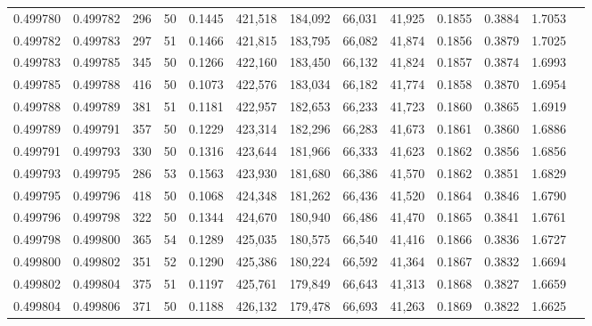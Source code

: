 \begin{tabular}{rrrrrrrrrrrrr}
0.499780 & 0.499782 & 296 &  50 &                                     0.1445 & 421,518 & 184,092 &  66,031 &  41,925 & 0.1855 & 0.3884 & 1.7053 \\
0.499782 & 0.499783 & 297 &  51 &                                     0.1466 & 421,815 & 183,795 &  66,082 &  41,874 & 0.1856 & 0.3879 & 1.7025 \\
0.499783 & 0.499785 & 345 &  50 &                                     0.1266 & 422,160 & 183,450 &  66,132 &  41,824 & 0.1857 & 0.3874 & 1.6993 \\
0.499785 & 0.499788 & 416 &  50 &                                     0.1073 & 422,576 & 183,034 &  66,182 &  41,774 & 0.1858 & 0.3870 & 1.6954 \\
0.499788 & 0.499789 & 381 &  51 &                                     0.1181 & 422,957 & 182,653 &  66,233 &  41,723 & 0.1860 & 0.3865 & 1.6919 \\
0.499789 & 0.499791 & 357 &  50 &                                     0.1229 & 423,314 & 182,296 &  66,283 &  41,673 & 0.1861 & 0.3860 & 1.6886 \\
0.499791 & 0.499793 & 330 &  50 &                                     0.1316 & 423,644 & 181,966 &  66,333 &  41,623 & 0.1862 & 0.3856 & 1.6856 \\
0.499793 & 0.499795 & 286 &  53 &                                     0.1563 & 423,930 & 181,680 &  66,386 &  41,570 & 0.1862 & 0.3851 & 1.6829 \\
0.499795 & 0.499796 & 418 &  50 &                                     0.1068 & 424,348 & 181,262 &  66,436 &  41,520 & 0.1864 & 0.3846 & 1.6790 \\
0.499796 & 0.499798 & 322 &  50 &                                     0.1344 & 424,670 & 180,940 &  66,486 &  41,470 & 0.1865 & 0.3841 & 1.6761 \\
0.499798 & 0.499800 & 365 &  54 &                                     0.1289 & 425,035 & 180,575 &  66,540 &  41,416 & 0.1866 & 0.3836 & 1.6727 \\
0.499800 & 0.499802 & 351 &  52 &                                     0.1290 & 425,386 & 180,224 &  66,592 &  41,364 & 0.1867 & 0.3832 & 1.6694 \\
0.499802 & 0.499804 & 375 &  51 &                                     0.1197 & 425,761 & 179,849 &  66,643 &  41,313 & 0.1868 & 0.3827 & 1.6659 \\
0.499804 & 0.499806 & 371 &  50 &                                     0.1188 & 426,132 & 179,478 &  66,693 &  41,263 & 0.1869 & 0.3822 & 1.6625 \\

\end{tabular}
